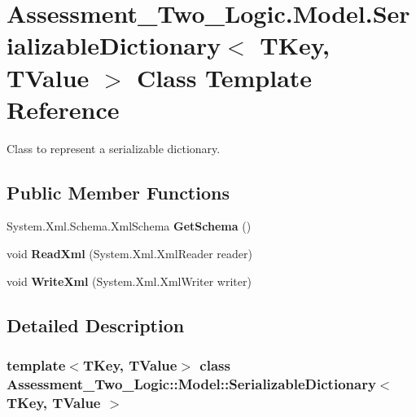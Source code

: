 \hypertarget{class_assessment___two___logic_1_1_model_1_1_serializable_dictionary-g}{
\section{Assessment\_\-Two\_\-Logic.Model.SerializableDictionary$<$ TKey, TValue $>$ Class Template Reference}
\label{class_assessment___two___logic_1_1_model_1_1_serializable_dictionary-g}
}


Class to represent a serializable dictionary.  


\subsection*{Public Member Functions}
\begin{DoxyCompactItemize}
\item 
\hypertarget{class_assessment___two___logic_1_1_model_1_1_serializable_dictionary-g_a493e90e3f270a00fb8677e8265021956}{
System.Xml.Schema.XmlSchema {\bfseries GetSchema} ()}
\label{class_assessment___two___logic_1_1_model_1_1_serializable_dictionary-g_a493e90e3f270a00fb8677e8265021956}

\item 
\hypertarget{class_assessment___two___logic_1_1_model_1_1_serializable_dictionary-g_a7ec2d323ad1950e7a202fbe65c605417}{
void {\bfseries ReadXml} (System.Xml.XmlReader reader)}
\label{class_assessment___two___logic_1_1_model_1_1_serializable_dictionary-g_a7ec2d323ad1950e7a202fbe65c605417}

\item 
\hypertarget{class_assessment___two___logic_1_1_model_1_1_serializable_dictionary-g_a0fbbe5f9f38f009803850040e7e98e42}{
void {\bfseries WriteXml} (System.Xml.XmlWriter writer)}
\label{class_assessment___two___logic_1_1_model_1_1_serializable_dictionary-g_a0fbbe5f9f38f009803850040e7e98e42}

\end{DoxyCompactItemize}


\subsection{Detailed Description}
\subsubsection*{template$<$TKey, TValue$>$ class Assessment\_\-Two\_\-Logic::Model::SerializableDictionary$<$ TKey, TValue $>$}

